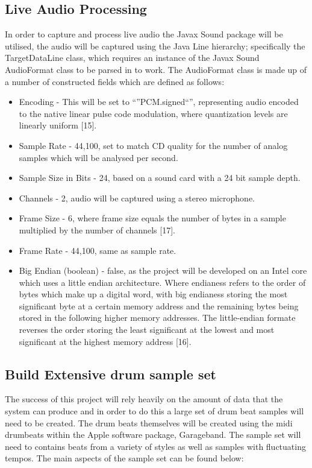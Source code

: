 \documentclass[a4paper, 11pt]{article}
\begin{document}
\subsection{Live Audio Processing}
In order to capture and process live audio the Javax Sound package will be utilised, the audio will be captured using the Java Line hierarchy; specifically the TargetDataLine class, which requires an instance of the Javax Sound AudioFormat class to be parsed in to work. The AudioFormat class is made up of a number of constructed fields which are defined as follows:

\begin{itemize}
\item Encoding - This will be set to ``''PCM.signed``'', representing audio encoded to the native linear pulse code modulation, where quantization levels are linearly uniform [15].
\item Sample Rate - 44,100, set to match CD quality for the number of analog samples which will be analysed per second. 
\item Sample Size in Bits - 24, based on a sound card with a 24 bit sample depth.
\item Channels - 2, audio will be captured using a stereo microphone.
\item Frame Size - 6, where frame size equals the number of bytes in a sample multiplied by the number of channels [17].
\item Frame Rate - 44,100, same as sample rate.
\item Big Endian (boolean) - false, as the project will be developed on an Intel core which uses a little endian architecture. Where endianess refers to the order of bytes which make up a digital word, with big endianess storing the most significant byte at a certain memory address and the remaining bytes being stored in the following higher memory addresses. The little-endian formate reverses the order storing the least significant at the lowest and most significant at the highest memory address [16].
\end{itemize}


\subsection{Build Extensive drum sample set}
The success of this project will rely heavily on the amount of data that the system can produce and in order to do this a large set of drum beat samples will need to be created. The drum beats themselves will be created using the midi drumbeats within the Apple software package, Garageband. The sample set will need to contains beats from a variety of styles as well as samples with fluctuating tempos. The main aspects of the sample set can be found below:
\end{document}
